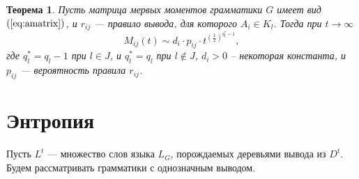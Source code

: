 \documentclass[12pt]{article}
\newtheorem{theorem}{Теорема}
\begin{document}
{\begin{theorem}
	Пусть матрица мервых моментов грамматики $G$ имеет вид $(\ref{eq:amatrix})$, и $r_{ij}$ --- правило вывода, для которого $A_i \in K_l$. Тогда при $t \rightarrow \infty$
	\begin{equation*}
	\label{eq:mij_result}
		M_{ij}(t) \sim d_i \cdot p_{ij} \cdot t^{\left(\frac{1}{2}\right)^{q_l^* - 1}},
	\end{equation*}
	где $q_l^* = q_l - 1$ при $l \in J$, и $q^*_l = q_l$ при $l \notin J$, $d_i > 0$ -- некоторая константа, и $p_{ij}$ --- вероятность правила $r_{ij}$.
\end{theorem}


\section{Энтропия}
Пусть $L^t$ --- множество слов языка $L_G$, порождаемых деревьями вывода из $D^t$. Будем рассматривать грамматики с однозначным выводом.

}
\end{document}
